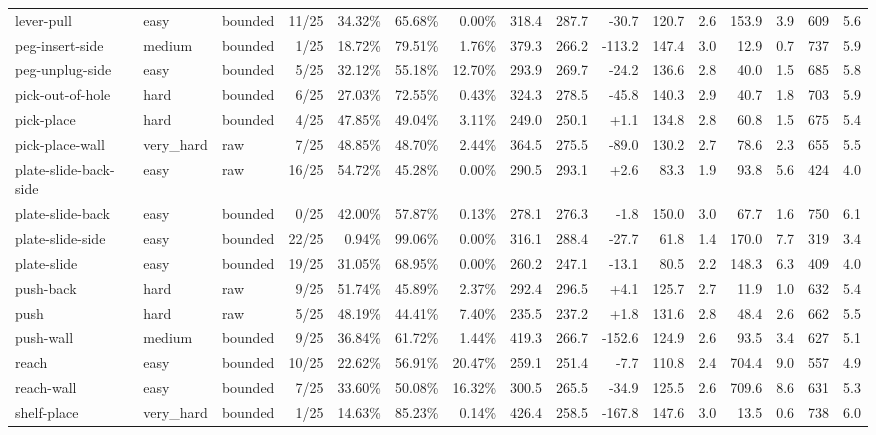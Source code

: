 \begin{landscape}
\begin{longtable}{@{}l l l r r r r r r r r r r r r r@{}}
lever-pull & easy & bounded & 11/25 & 34.32\% & 65.68\% & 0.00\% & 318.4 & 287.7 & -30.7 & 120.7 & 2.6 & 153.9 & 3.9 & 609 & 5.6 \\
peg-insert-side & medium & bounded & 1/25 & 18.72\% & 79.51\% & 1.76\% & 379.3 & 266.2 & -113.2 & 147.4 & 3.0 & 12.9 & 0.7 & 737 & 5.9 \\
peg-unplug-side & easy & bounded & 5/25 & 32.12\% & 55.18\% & 12.70\% & 293.9 & 269.7 & -24.2 & 136.6 & 2.8 & 40.0 & 1.5 & 685 & 5.8 \\
pick-out-of-hole & hard & bounded & 6/25 & 27.03\% & 72.55\% & 0.43\% & 324.3 & 278.5 & -45.8 & 140.3 & 2.9 & 40.7 & 1.8 & 703 & 5.9 \\
pick-place & hard & bounded & 4/25 & 47.85\% & 49.04\% & 3.11\% & 249.0 & 250.1 & +1.1 & 134.8 & 2.8 & 60.8 & 1.5 & 675 & 5.4 \\
pick-place-wall & very\_hard & raw & 7/25 & 48.85\% & 48.70\% & 2.44\% & 364.5 & 275.5 & -89.0 & 130.2 & 2.7 & 78.6 & 2.3 & 655 & 5.5 \\
plate-slide-back-side & easy & raw & 16/25 & 54.72\% & 45.28\% & 0.00\% & 290.5 & 293.1 & +2.6 & 83.3 & 1.9 & 93.8 & 5.6 & 424 & 4.0 \\
plate-slide-back & easy & bounded & 0/25 & 42.00\% & 57.87\% & 0.13\% & 278.1 & 276.3 & -1.8 & 150.0 & 3.0 & 67.7 & 1.6 & 750 & 6.1 \\
plate-slide-side & easy & bounded & 22/25 & 0.94\% & 99.06\% & 0.00\% & 316.1 & 288.4 & -27.7 & 61.8 & 1.4 & 170.0 & 7.7 & 319 & 3.4 \\
plate-slide & easy & bounded & 19/25 & 31.05\% & 68.95\% & 0.00\% & 260.2 & 247.1 & -13.1 & 80.5 & 2.2 & 148.3 & 6.3 & 409 & 4.0 \\
push-back & hard & raw & 9/25 & 51.74\% & 45.89\% & 2.37\% & 292.4 & 296.5 & +4.1 & 125.7 & 2.7 & 11.9 & 1.0 & 632 & 5.4 \\
push & hard & raw & 5/25 & 48.19\% & 44.41\% & 7.40\% & 235.5 & 237.2 & +1.8 & 131.6 & 2.8 & 48.4 & 2.6 & 662 & 5.5 \\
push-wall & medium & bounded & 9/25 & 36.84\% & 61.72\% & 1.44\% & 419.3 & 266.7 & -152.6 & 124.9 & 2.6 & 93.5 & 3.4 & 627 & 5.1 \\
reach & easy & bounded & 10/25 & 22.62\% & 56.91\% & 20.47\% & 259.1 & 251.4 & -7.7 & 110.8 & 2.4 & 704.4 & 9.0 & 557 & 4.9 \\
reach-wall & easy & bounded & 7/25 & 33.60\% & 50.08\% & 16.32\% & 300.5 & 265.5 & -34.9 & 125.5 & 2.6 & 709.6 & 8.6 & 631 & 5.3 \\
shelf-place & very\_hard & bounded & 1/25 & 14.63\% & 85.23\% & 0.14\% & 426.4 & 258.5 & -167.8 & 147.6 & 3.0 & 13.5 & 0.6 & 738 & 6.0 \\

\end{longtable}
\end{landscape}
